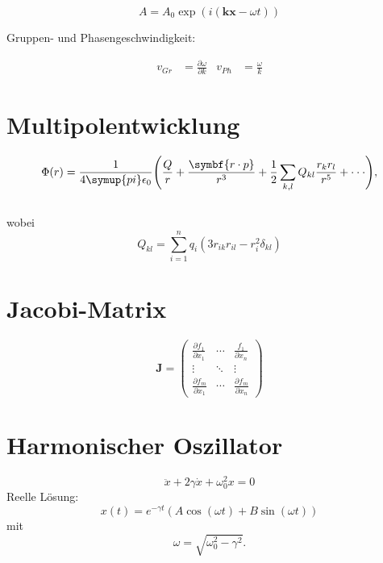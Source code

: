 \documentclass{scrartcl}
\begin{document}
\begin{equation}
  A=A_0\exp (i({\symbf{kx}-\omega t}))  %
\end{equation}

Gruppen- und Phasengeschwindigkeit:

\begin{align}
  v_{Gr} &=\frac{\partial\omega}{\partial k} &
  v_{Ph} &= \frac{\omega}{k}
\end{align}

\section{Multipolentwicklung}
\begin{equation}
  \Phi(r) = \frac{1}{4\symup{pi}\epsilon_0}\Biggl(\frac{Q}{r} +
  \frac{\symbf{r\cdot p}} {r^3} + \frac{1}{2} \sum_{k,l}
  Q_{kl}\frac{r_k r_l}{r^5} + \cdot\cdot\cdot \Biggr),
\end{equation} \\
wobei
\begin{equation*}
  Q_{kl}= \sum_{i=1}^n q_i (3r_{ik} r_{il} - r_i^2 \delta_{kl})
\end{equation*}
\section{Jacobi-Matrix}

\begin{equation}
  \symbf{J}=
  \begin{pmatrix}
    \frac{\partial f_1}{\partial x_1} & \cdots & \frac{f_1}{\partial x_n} \\
    \vdots & \ddots & \vdots \\
    \frac{\partial f_m} {\partial x_1} & \cdots & \frac{\partial f_m}{\partial x_n}
  \end{pmatrix}
\end{equation}

\section{Harmonischer Oszillator}
\begin{equation}
  \ddot{x} + 2\gamma\dot{x} +\omega_0^2x= 0
\end{equation}
Reelle Lösung:
\begin{equation}
  x(t)= e^{-\gamma t}
(A\cos{(\omega t)} + B\sin{(\omega t)})
\end{equation}
mit
\begin{equation}
  \omega = \sqrt{\omega_0^2-\gamma^2}.
\end{equation}
\end{document}
